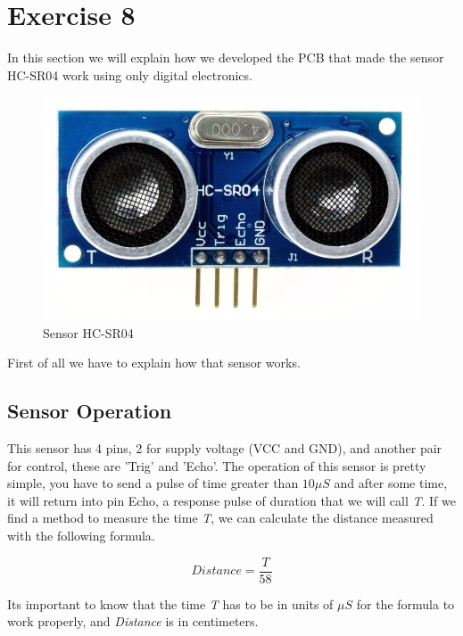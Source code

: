 
\section{\color{olive}Exercise 8}

In this section we will explain how we developed the PCB that made
the sensor HC-SR04 work using only digital electronics. 

\begin{figure}[h!]
\begin{centering}
\includegraphics[scale=0.2]{../Exercise8/Informe/images/HC-SR04}
\par\end{centering}
\caption{\color{cyan}Sensor HC-SR04}
\end{figure}

First of all we have to explain how that sensor works.

\subsection{\color{purple}Sensor Operation}

This sensor has 4 pins, 2 for supply voltage (VCC and GND), and another
pair for control, these are 'Trig' and 'Echo'. The operation of this
sensor is pretty simple, you have to send a pulse of time greater
than $10\mu S$ and after some time, it will return into pin Echo,
a response pulse of duration that we will call \emph{T}. If we find
a method to measure the time \emph{T}, we can calculate the distance
measured with the following formula.

\[
Distance=\frac{T}{58}
\]

Its important to know that the time \emph{T }has to be in units of
$\mu S$ for the formula to work properly, and \emph{Distance }is
in centimeters.

